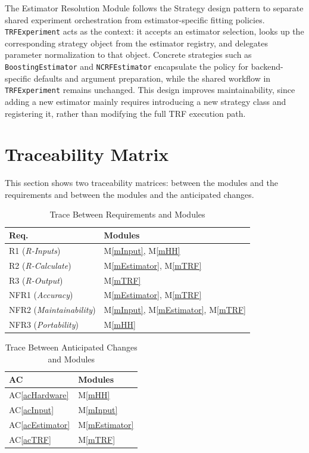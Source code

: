 \documentclass[12pt, titlepage]{article}
\newcommand{\acref}[1]{AC\ref{#1}}
\newcommand{\mref}[1]{M\ref{#1}}
\begin{document}
The Estimator Resolution Module follows the Strategy design pattern to separate shared experiment orchestration from estimator-specific fitting policies. \texttt{TRFExperiment} acts as the context: it accepts an estimator selection, looks up the corresponding strategy object from the estimator registry, and delegates parameter normalization to that object. Concrete strategies such as \texttt{BoostingEstimator} and \texttt{NCRFEstimator} encapsulate the policy for backend-specific defaults and argument preparation, while the shared workflow in \texttt{TRFExperiment} remains unchanged. This design improves maintainability, since adding a new estimator mainly requires introducing a new strategy class and registering it, rather than modifying the full TRF execution path.

\section{Traceability Matrix} \label{SecTM}

This section shows two traceability matrices: between the modules and the
requirements and between the modules and the anticipated changes.

\begin{table}[H]
\centering
\begin{tabular}{p{} p{}}
\toprule
\textbf{Req.} & \textbf{Modules}\\
\midrule
R1 (\textit{R-Inputs}) & \mref{mInput}, \mref{mHH}\\
R2 (\textit{R-Calculate}) & \mref{mEstimator}, \mref{mTRF}\\
R3 (\textit{R-Output}) & \mref{mTRF}\\
NFR1 (\textit{Accuracy}) & \mref{mEstimator}, \mref{mTRF}\\
NFR2 (\textit{Maintainability}) & \mref{mInput}, \mref{mEstimator}, \mref{mTRF}\\
NFR3 (\textit{Portability}) & \mref{mHH}\\
\bottomrule
\end{tabular}
\caption{Trace Between Requirements and Modules}
\label{TblRT}
\end{table}

\begin{table}[H]
\centering
\begin{tabular}{p{} p{}}
\toprule
\textbf{AC} & \textbf{Modules}\\
\midrule
\acref{acHardware} & \mref{mHH}\\
\acref{acInput} & \mref{mInput}\\
\acref{acEstimator} & \mref{mEstimator}\\
\acref{acTRF} & \mref{mTRF}\\
\bottomrule
\end{tabular}
\caption{Trace Between Anticipated Changes and Modules}
\label{TblACT}
\end{table}
\end{document}
